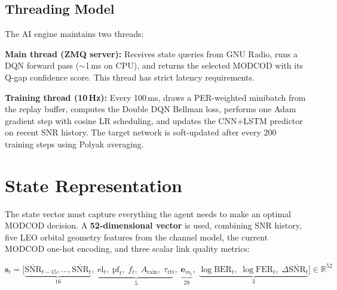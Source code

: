 \documentclass[12pt,a4paper]{report}
\begin{document}
\subsection{Threading Model}

The AI engine maintains two threads:

\textbf{Main thread (ZMQ server):} Receives state queries from GNU Radio,
runs a DQN forward pass ($\sim$1\,ms on CPU), and returns the selected
MODCOD with its Q-gap confidence score. This thread has strict latency
requirements.

\textbf{Training thread (10\,Hz):} Every 100\,ms, draws a PER-weighted
minibatch from the replay buffer, computes the Double DQN Bellman loss,
performs one Adam gradient step with cosine LR scheduling, and updates
the CNN+LSTM predictor on recent SNR history. The target network is
soft-updated after every 200 training steps using Polyak averaging.

\section{State Representation}
\label{sec:state}

The state vector must capture everything the agent needs to make an optimal
MODCOD decision. A \textbf{52-dimensional vector} is used, combining SNR
history, five LEO orbital geometry features from the channel model, the
current MODCOD one-hot encoding, and three scalar link quality metrics:

\begin{equation}
    \mathbf{s}_t = \bigl[
        \underbrace{\overline{\text{SNR}}_{t-15},\ldots,\overline{\text{SNR}}_t}_{16},\;
        \underbrace{\text{el}_t,\;\text{pf}_t,\;\dot{f}_t,\;A_\text{rain},\;\tau_\text{rtt}}_{5},\;
        \underbrace{\mathbf{e}_{m_t}}_{28},\;
        \underbrace{\log\text{BER}_t,\;\log\text{FER}_t,\;\Delta\overline{\text{SNR}}_t}_{3}
    \bigr] \in \mathbb{R}^{52}
\end{equation}
\end{document}
